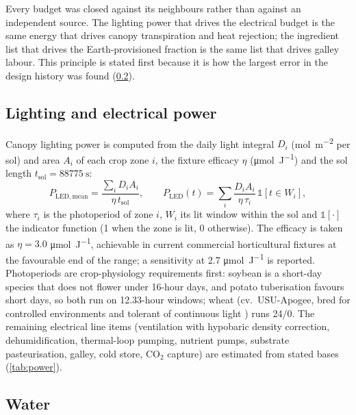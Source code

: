 \documentclass[11pt,a4paper,3p,authoryear]{elsarticle}
\begin{document}
Every budget was closed against its neighbours rather than against an independent source. The lighting power that drives the electrical budget is the same energy that drives canopy transpiration and heat rejection; the ingredient list that drives the Earth-provisioned fraction is the same list that drives galley labour. This principle is stated first because it is how the largest error in the design history was found (\cref{sec:water}).

\subsection{Lighting and electrical power}

Canopy lighting power is computed from the daily light integral $D_i$ (\si{\mole\per\metre\squared} per sol) and area $A_i$ of each crop zone $i$, the fixture efficacy $\eta$ (\si{\micro\mole\per\joule}) and the sol length $t_\mathrm{sol} = \SI{88775}{\second}$:
\begin{equation}
P_\mathrm{LED,mean} = \frac{\sum_i D_i A_i}{\eta\, t_\mathrm{sol}}, \qquad
P_\mathrm{LED}(t) = \sum_i \frac{D_i A_i}{\eta\, \tau_i}\,\mathbb{1}[t \in W_i],
\label{eq:led}
\end{equation}
where $\tau_i$ is the photoperiod of zone $i$, $W_i$ its lit window within the sol and $\mathbb{1}[\cdot]$ the indicator function (1 when the zone is lit, 0 otherwise). The efficacy is taken as $\eta = 3.0$ \si{\micro\mole\per\joule}, achievable in current commercial horticultural fixtures at the favourable end of the range; a sensitivity at 2.7 \si{\micro\mole\per\joule} is reported. Photoperiods are crop-physiology requirements first: soybean is a short-day species that does not flower under 16-hour days, and potato tuberisation favours short days, so both run on 12.33-hour windows; wheat (cv.\ USU-Apogee, bred for controlled environments and tolerant of continuous light \citep{Bugbee1997apogee}) runs 24/0. The remaining electrical line items (ventilation with hypobaric density correction, dehumidification, thermal-loop pumping, nutrient pumps, substrate pasteurisation, galley, cold store, CO$_2$ capture) are estimated from stated bases (\cref{tab:power}).

\subsection{Water}\label{sec:water}
\end{document}
